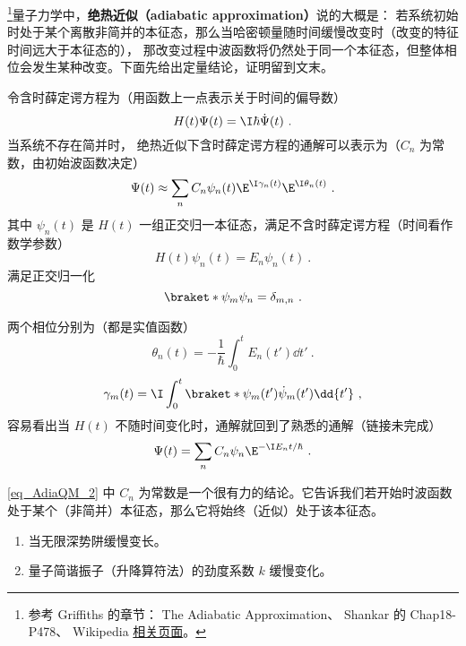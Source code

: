 
\begin{issues}
\issueTODO
\end{issues}

\footnote{参考 Griffiths\cite{GriffE} 的章节： The Adiabatic Approximation、 Shankar\cite{Shankar} 的 Chap18-P478、 Wikipedia \href{https://en.wikipedia.org/wiki/Adiabatic_theorem}{相关页面}。}量子力学中，\textbf{绝热近似（adiabatic approximation）}说的大概是： 若系统初始时处于某个离散非简并的本征态，那么当哈密顿量随时间缓慢改变时（改变的特征时间远大于本征态的）， 那改变过程中波函数将仍然处于同一个本征态，但整体相位会发生某种改变。下面先给出定量结论，证明留到文末。

令含时薛定谔方程为（用函数上一点表示关于时间的偏导数）
\begin{equation}
H(t)\Psi(t) = \I\hbar\dot\Psi(t)~.
\end{equation}
当系统不存在简并时， 绝热近似下含时薛定谔方程的通解可以表示为（$C_n$ 为常数，由初始波函数决定）
\begin{equation}\label{eq_AdiaQM_2}
\Psi(t) \approx \sum_n C_n \psi_n(t) \E^{\I\gamma_n(t)}\E^{\I\theta_n(t)}~.
\end{equation}
其中 $\psi_n(t)$ 是 $H(t)$ 一组正交归一本征态，满足不含时薛定谔方程（时间看作数学参数）
\begin{equation}\label{eq_AdiaQM_3}
H(t)\psi_n(t) = E_n\psi_n(t)~.
\end{equation}
满足正交归一化
\begin{equation}\label{eq_AdiaQM_6}
\braket*{\psi_m}{\psi_n} = \delta_{m,n}~.
\end{equation}

两个相位分别为（都是实值函数）
\begin{equation}
\theta_n(t) = -\frac{1}{\hbar} \int_0^t E_n(t')\dd{t'}~.
\end{equation}
\begin{equation}
\gamma_m(t) = \I\int_0^t \braket*{\psi_m(t')}{\dot\psi_m(t')}\dd{t'}~,
\end{equation}
容易看出当 $H(t)$ 不随时间变化时，通解就回到了熟悉的通解（链接未完成）
\begin{equation}
\Psi(t) = \sum_n C_n \psi_n \E^{-\I E_n t/\hbar}~.
\end{equation}

\autoref{eq_AdiaQM_2} 中 $C_n$ 为常数是一个很有力的结论。它告诉我们若开始时波函数处于某个（非简并）本征态，那么它将始终（近似）处于该本征态。

\begin{example}{}
\begin{enumerate}
\item 当无限深势阱缓慢变长。
\item 量子简谐振子（升降算符法）的劲度系数 $k$ 缓慢变化。
\end{enumerate}
\end{example}


